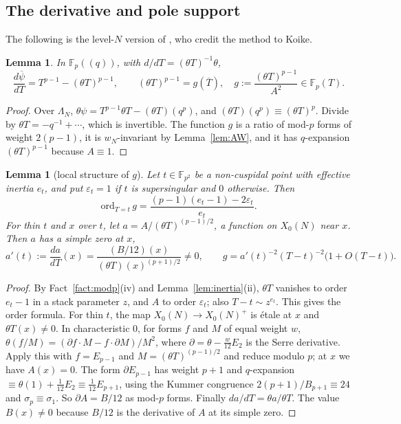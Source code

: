 \documentclass[11pt,a4paper]{article}
\numberwithin{equation}{section}
\newtheorem{lemma}[theorem]{Lemma}
\theoremstyle{definition}
\theoremstyle{remark}
\newcommand{\Fp}{\mathbb F_p}
\newcommand{\Fq}{\mathbb F_{p^2}}
\begin{document}
\subsection{The derivative and pole support}

The following is the level-$N$ version of \citet[\S10, (35)--(38)]{KZ98}, who credit the method to Koike.

\begin{lemma}\label{lem:dpsi}
In $\Fp((q))$, with $d/dT=(\theta T)^{-1}\theta$,
\[
\frac{d\overline\psi}{dT}=T^{p-1}-(\theta T)^{p-1},\qquad (\theta T)^{p-1}=g(\overline T),\quad
g:=\frac{(\theta T)^{p-1}}{A^2}\in\Fp(T).
\]
\end{lemma}
\begin{proof}
Over $\Lambda_N$, $\theta\psi=T^{p-1}\theta T-(\theta T)(q^p)$, and $(\theta T)(q^p)\equiv(\theta T)^p$.
Divide by $\theta T=-q^{-1}+\cdots$, which is invertible. The function $g$ is a ratio of mod-$p$
forms of weight $2(p-1)$, it is $w_N$-invariant by Lemma~\ref{lem:AW}, and it has $q$-expansion
$(\theta T)^{p-1}$ because $A\equiv1$.
\end{proof}

\begin{lemma}[local structure of $g$]\label{lem:g}
Let $t\in\Fq$ be a non-cuspidal point with effective inertia $e_t$, and put $\varepsilon_t=1$ if
$t$ is supersingular and $0$ otherwise. Then
\[
\mathrm{ord}_{T=t}\,g=\frac{(p-1)(e_t-1)-2\varepsilon_t}{e_t}.
\]
For thin $t$ and $x$ over $t$, let $a=A/(\theta T)^{(p-1)/2}$, a function on $X_0(N)$ near $x$.
Then $a$ has a simple zero at $x$,
\[
a'(t):=\frac{da}{dT}(x)=\frac{(B/12)(x)}{(\theta T)(x)^{(p+1)/2}}\ne0,
\qquad g=a'(t)^{-2}(T-t)^{-2}\bigl(1+O(T-t)\bigr).
\]
\end{lemma}
\begin{proof}
By Fact~\ref{fact:modp}(iv) and Lemma~\ref{lem:inertia}(ii), $\theta T$ vanishes to order $e_t-1$ in a
stack parameter $z$, and $A$ to order $\varepsilon_t$; also $T-t\sim z^{e_t}$. This gives the order formula.
For thin $t$, the map $X_0(N)\to X_0(N)^+$ is \'etale at $x$ and $\theta T(x)\ne0$. In
characteristic $0$, for forms $f$ and $M$ of equal weight $w$,
$\theta(f/M)=(\partial f\cdot M-f\cdot\partial M)/M^2$, where $\partial=\theta-\frac{w}{12}E_2$ is the
Serre derivative. Apply this with $f=E_{p-1}$ and $M=(\theta T)^{(p-1)/2}$ and reduce modulo $p$; at
$x$ we have $A(x)=0$. The form $\partial E_{p-1}$ has weight $p+1$ and $q$-expansion
$\equiv\theta(1)+\frac1{12}E_2\equiv\frac1{12}E_{p+1}$, using the Kummer congruence
$2(p+1)/B_{p+1}\equiv24$ and $\sigma_p\equiv\sigma_1$. So $\partial A=B/12$ as mod-$p$ forms. Finally
$da/dT=\theta a/\theta T$. The value $B(x)\ne0$ because $B/12$ is the derivative of $A$ at its simple zero.
\end{proof}
\end{document}
